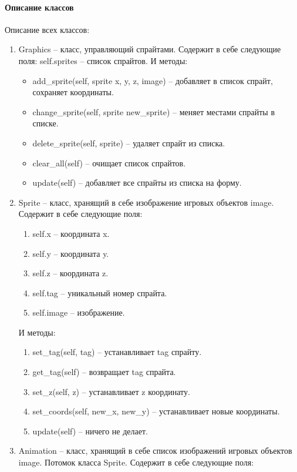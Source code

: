 \paragraph{Описание классов}
Описание всех классов:
\begin{enumerate}
	\item Graphics -- класс, управляющий спрайтами. Содержит в себе следующие поля: self.sprites -- список спрайтов. И методы:
		\begin{itemize}
			\item add\_sprite(self, sprite x, y, z, image) -- добавляет в список спрайт, сохраняет координаты.
			\item change\_sprite(self, sprite new\_sprite) -- меняет местами спрайты в списке.
			\item delete\_sprite(self, sprite) -- удаляет спрайт из списка.
			\item clear\_all(self) -- очищает список спрайтов.
			\item update(self) -- добавляет все спрайты из списка на форму.
		\end{itemize}
	\item Sprite -- класс, хранящий в себе изображение игровых объектов image. Содержит в себе следующие поля:
		\begin{enumerate}
			\item self.x -- координата x.
			\item self.y -- координата y.
			\item self.z -- координата z.
			\item self.tag -- уникальный номер спрайта.
			\item self.image -- изображение.
		\end{enumerate}
		И методы:
		\begin{enumerate}
			\item set\_tag(self, tag) -- устанавливает tag спрайту.
			\item get\_tag(self) -- возвращает tag спрайта.
			\item set\_z(self, z) -- устанавливает z координату.
			\item set\_coords(self, new\_x, new\_y) -- устанавливает новые координаты.
			\item update(self) -- ничего не делает.
		\end{enumerate}
	\item Animation -- класс, хранящий в себе список изображений игровых объектов image. Потомок класса Sprite.  Содержит в себе следующие поля:
		\begin{enumerate}

\end{enumerate}
\end{enumerate}
